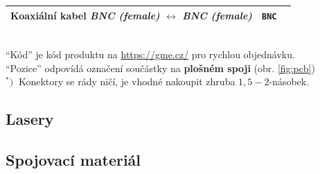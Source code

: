 \documentclass[twoside,project,skipblank]{../MFFPrace}
\begin{document}
\begin{landscape}
\begin{table}[!h]
\begin{tabular}{|l|l|l||c|l|r||l|l|l|l|}
            \multicolumn{6}{|l||}{Koaxiální kabel \textit{BNC (female)} $\leftrightarrow$ \textit{BNC (female)}} & \texttt{BNC}                             & \multicolumn{3}{l|}{}                                                                                                                                                                                                                                                                                                                                                                            \\\hline
        \end{tabular}\\
        \small{
            "`Kód"' je kód produktu na \url{https://gme.cz/} pro rychlou objednávku.\\
            "`Pozice"' odpovídá označení součástky na \textbf{plošném spoji} (obr. \ref{fig:pcb})\\
            $^*)\:$ Konektory se rády ničí, je vhodné nakoupit zhruba $1{,}5-2$-násobek.
        }
        \label{tbl:cables}
    \end{table}
\end{landscape}

\subsection{Lasery}

\subsection{Spojovací materiál}
\end{document}
